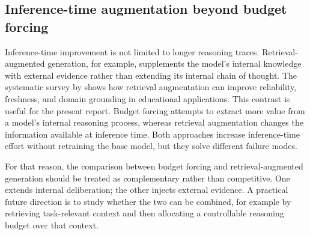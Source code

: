 \subsection{Inference-time augmentation beyond budget forcing}

Inference-time improvement is not limited to longer reasoning traces. Retrieval-augmented generation, for example, supplements the model's internal knowledge with external evidence rather than extending its internal chain of thought. The systematic survey by \citet{li2025ragsurvey} shows how retrieval augmentation can improve reliability, freshness, and domain grounding in educational applications. This contrast is useful for the present report. Budget forcing attempts to extract more value from a model's internal reasoning process, whereas retrieval augmentation changes the information available at inference time. Both approaches increase inference-time effort without retraining the base model, but they solve different failure modes.

For that reason, the comparison between budget forcing and retrieval-augmented generation should be treated as complementary rather than competitive. One extends internal deliberation; the other injects external evidence. A practical future direction is to study whether the two can be combined, for example by retrieving task-relevant context and then allocating a controllable reasoning budget over that context.